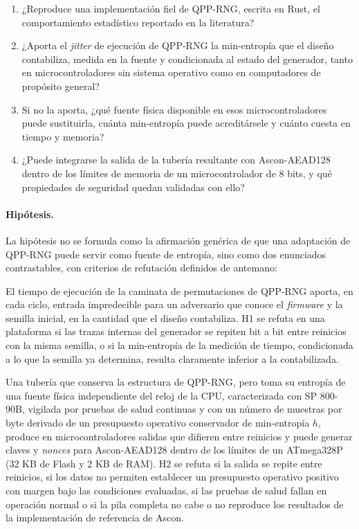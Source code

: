 \begin{enumerate}[label=\textbf{PI\arabic*.}, leftmargin=*]
    \item ¿Reproduce una implementación fiel de QPP-RNG, escrita en Rust, el comportamiento estadístico reportado en la literatura?
    \item ¿Aporta el \textit{jitter} de ejecución de QPP-RNG la min-entropía que el diseño contabiliza, medida en la fuente y condicionada al estado del generador, tanto en microcontroladores sin sistema operativo como en computadores de propósito general?
    \item Si no la aporta, ¿qué fuente física disponible en esos microcontroladores puede sustituirla, cuánta min-entropía puede acreditársele y cuánto cuesta en tiempo y memoria?
    \item ¿Puede integrarse la salida de la tubería resultante con Ascon-AEAD128 dentro de los límites de memoria de un microcontrolador de 8 bits, y qué propiedades de seguridad quedan validadas con ello?
\end{enumerate}

\paragraph{Hipótesis.} La hipótesis no se formula como la afirmación genérica de que una adaptación de QPP-RNG puede servir como fuente de entropía, sino como dos enunciados contrastables, con criterios de refutación definidos de antemano:

\begin{description}[leftmargin=0pt]
    \item[H1.] El tiempo de ejecución de la caminata de permutaciones de QPP-RNG aporta, en cada ciclo, entrada impredecible para un adversario que conoce el \textit{firmware} y la semilla inicial, en la cantidad que el diseño contabiliza. H1 se refuta en una plataforma si las trazas internas del generador se repiten bit a bit entre reinicios con la misma semilla, o si la min-entropía de la medición de tiempo, condicionada a lo que la semilla ya determina, resulta claramente inferior a la contabilizada.
    \item[H2.] Una tubería que conserva la estructura de QPP-RNG, pero toma su entropía de una fuente física independiente del reloj de la CPU, caracterizada con SP 800-90B, vigilada por pruebas de salud continuas y con un número de muestras por byte derivado de un presupuesto operativo conservador de min-entropía $h$, produce en microcontroladores salidas que difieren entre reinicios y puede generar claves y \textit{nonces} para Ascon-AEAD128 dentro de los límites de un ATmega328P (32 KB de Flash y 2 KB de RAM). H2 se refuta si la salida se repite entre reinicios, si los datos no permiten establecer un presupuesto operativo positivo con margen bajo las condiciones evaluadas, si las pruebas de salud fallan en operación normal o si la pila completa no cabe o no reproduce los resultados de la implementación de referencia de Ascon.
\end{description}

